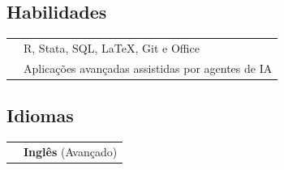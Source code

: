 \documentclass[a4paper,12pt]{article}
\begin{document}
	\subsection*{Habilidades}
	\setlength{\LTleft}{0pt}
	\begin{longtable}[t]{>{\raggedleft\arraybackslash}p{2.0cm}>{\raggedright\arraybackslash}p{13.5cm}}
			& R, Stata, SQL, \LaTeX{}, Git e Office \\
			& Aplicações avançadas assistidas por agentes de IA
	\end{longtable}

	\subsection*{Idiomas}
	\setlength{\LTleft}{0pt}
	\begin{longtable}[t]{>{\raggedleft\arraybackslash}p{2.0cm}>{\raggedright\arraybackslash}p{13.5cm}}
			 & \textbf{Inglês} (Avançado) \\
	\end{longtable}
\end{document}
